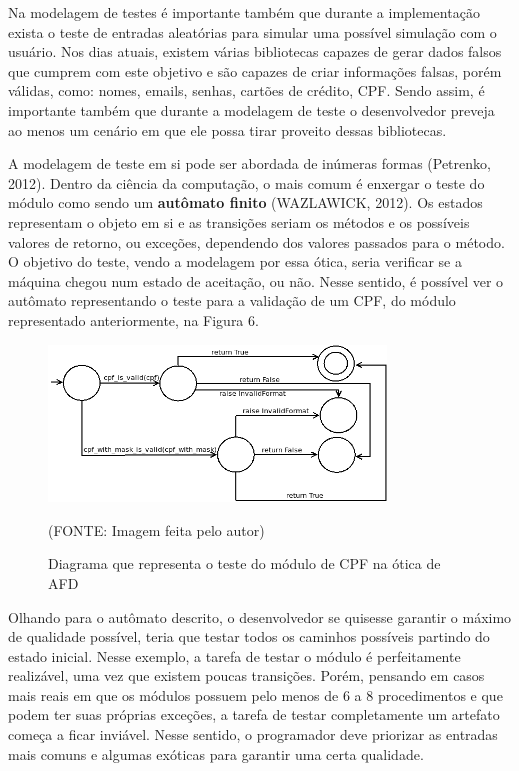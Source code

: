 \documentclass[
    12pt,       %
    openright,      %
    twoside,      %
    a4paper,      %
    english,      %
    french,       %
    spanish,      %
    brazil,       %
    ]{abntex2}
\begin{document}
          Na modelagem de testes é importante também que durante a implementação exista
          o teste de entradas aleatórias para simular uma possível simulação com o usuário.
          Nos dias atuais, existem várias bibliotecas capazes de gerar dados falsos que
          cumprem com este objetivo e são capazes de criar informações falsas, porém válidas,
          como: nomes, emails, senhas, cartões de crédito, CPF. Sendo assim, é importante
          também que durante a modelagem de teste o desenvolvedor preveja ao menos um cenário
          em que ele possa tirar proveito dessas bibliotecas.

          A modelagem de teste em si pode ser abordada de inúmeras formas (Petrenko, 2012).
          Dentro da ciência da computação, o mais comum é enxergar o teste do módulo como sendo um
          \textbf{autômato finito} (WAZLAWICK, 2012). Os estados representam o objeto em si e as transições
          seriam os métodos e os possíveis valores de retorno, ou exceções, dependendo dos
          valores passados para o método. O objetivo do teste, vendo a modelagem por essa
          ótica, seria  verificar se a máquina chegou num estado de aceitação, ou não.
          Nesse sentido, é possível ver o autômato representando o teste para a validação de
          um CPF, do módulo representado anteriormente, na Figura 6.

          \begin{figure}[!htb]
              \begin{center}
                  \includegraphics[width=0.80\textwidth]{img/afd.png}
              \end{center}
              \caption{\label{fig:passaro}Diagrama que representa o teste do módulo de CPF na ótica de AFD}
              \begin{center}(FONTE: Imagem feita pelo autor)\end{center}
          \end{figure}

          Olhando para o autômato descrito, o desenvolvedor se quisesse garantir
          o máximo de qualidade possível, teria que testar todos os caminhos possíveis
          partindo do estado inicial. Nesse exemplo, a tarefa de testar o módulo é perfeitamente
          realizável, uma vez que existem poucas transições. Porém, pensando em casos mais
          reais em que os módulos possuem pelo menos de 6 a 8 procedimentos e que podem ter
          suas próprias exceções, a tarefa de testar completamente um artefato começa a ficar
          inviável. Nesse sentido, o programador deve priorizar as entradas mais comuns
          e algumas exóticas para garantir uma certa qualidade.
\end{document}
